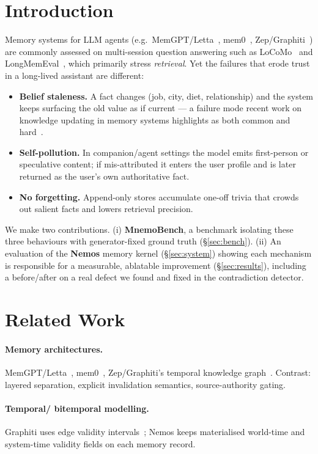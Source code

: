 \documentclass[11pt]{article}
\begin{document}
\section{Introduction}
\label{sec:intro}
Memory systems for LLM agents (e.g.\ MemGPT/Letta~\cite{memgpt}, mem0~\cite{mem0},
Zep/Graphiti~\cite{zep,graphiti}) are commonly assessed on multi-session question answering
such as LoCoMo~\cite{locomo} and LongMemEval~\cite{longmemeval}, which primarily stress
\emph{retrieval}. Yet the failures that erode trust in a long-lived assistant are different:
\begin{itemize}
  \item \textbf{Belief staleness.} A fact changes (job, city, diet, relationship) and the
  system keeps surfacing the old value as if current --- a failure mode recent work on
  knowledge updating in memory systems highlights as both common and hard~\cite{fama}.
  \item \textbf{Self-pollution.} In companion/agent settings the model emits first-person
  or speculative content; if mis-attributed it enters the user profile and is later returned
  as the user's own authoritative fact.
  \item \textbf{No forgetting.} Append-only stores accumulate one-off trivia that crowds out
  salient facts and lowers retrieval precision.
\end{itemize}
We make two contributions. (i) \textbf{MnemoBench}, a benchmark isolating these three
behaviours with generator-fixed ground truth (\S\ref{sec:bench}). (ii) An evaluation of the
\textbf{Nemos} memory kernel (\S\ref{sec:system}) showing each mechanism is responsible for a
measurable, ablatable improvement (\S\ref{sec:results}), including a before/after on a real
defect we found and fixed in the contradiction detector.

\section{Related Work}
\label{sec:related}
\paragraph{Memory architectures.} MemGPT/Letta~\cite{memgpt}, mem0~\cite{mem0},
Zep/Graphiti's temporal knowledge graph~\cite{zep,graphiti}. Contrast: layered separation,
explicit invalidation semantics, source-authority gating.
\paragraph{Temporal/ bitemporal modelling.} Graphiti uses edge validity
intervals~\cite{graphiti}; Nemos keeps materialised world-time and system-time validity
fields on each memory record.
\end{document}
